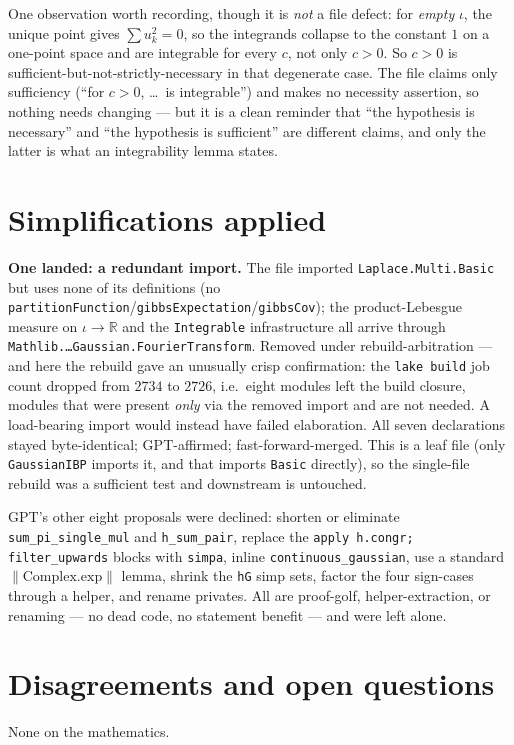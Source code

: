 \documentclass[11pt]{article}
\begin{document}
One observation worth recording, though it is \emph{not} a file defect: for \emph{empty} $\iota$, the unique
point gives $\sum u_k^2=0$, so the integrands collapse to the constant $1$ on a one-point space and are
integrable for every $c$, not only $c>0$. So $c>0$ is sufficient-but-not-strictly-necessary in that
degenerate case. The file claims only sufficiency (``for $c>0$, \dots\ is integrable'') and makes no necessity
assertion, so nothing needs changing --- but it is a clean reminder that ``the hypothesis is necessary'' and
``the hypothesis is sufficient'' are different claims, and only the latter is what an integrability lemma
states.

\section{Simplifications applied}
\textbf{One landed: a redundant import.} The file imported \texttt{Laplace.Multi.Basic} but uses none of its
definitions (no \texttt{partitionFunction}/\texttt{gibbsExpectation}/\texttt{gibbsCov}); the product-Lebesgue
measure on $\iota\to\mathbb R$ and the \texttt{Integrable} infrastructure all arrive through
\texttt{Mathlib.\dots Gaussian.FourierTransform}. Removed under rebuild-arbitration --- and here the rebuild
gave an unusually crisp confirmation: the \texttt{lake build} job count dropped from $2734$ to $2726$, i.e.\
eight modules left the build closure, modules that were present \emph{only} via the removed import and are not
needed. A load-bearing import would instead have failed elaboration. All seven declarations stayed
byte-identical; GPT-affirmed; fast-forward-merged. This is a leaf file (only \texttt{GaussianIBP} imports it,
and that imports \texttt{Basic} directly), so the single-file rebuild was a sufficient test and downstream is
untouched.

GPT's other eight proposals were declined: shorten or eliminate \texttt{sum\_pi\_single\_mul} and
\texttt{h\_sum\_pair}, replace the \texttt{apply h.congr; filter\_upwards} blocks with \texttt{simpa}, inline
\texttt{continuous\_gaussian}, use a standard $\|\mathrm{Complex.exp}\|$ lemma, shrink the \texttt{hG} simp
sets, factor the four sign-cases through a helper, and rename privates. All are proof-golf, helper-extraction,
or renaming --- no dead code, no statement benefit --- and were left alone.

\section{Disagreements and open questions}
None on the mathematics.
\end{document}
